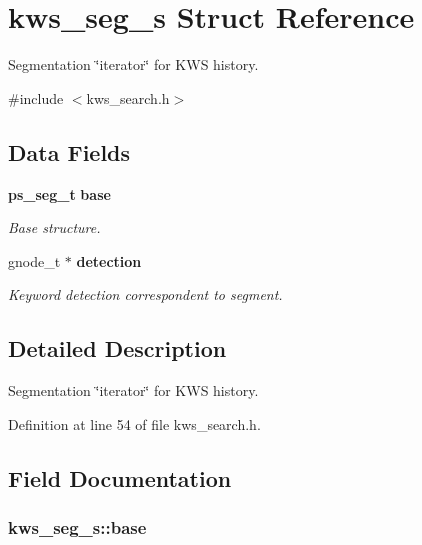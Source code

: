 \section{kws\+\_\+seg\+\_\+s Struct Reference}
\label{structkws__seg__s}


Segmentation \char`\"{}iterator\char`\"{} for K\+W\+S history.  




{\ttfamily \#include $<$kws\+\_\+search.\+h$>$}

\subsection*{Data Fields}
\begin{DoxyCompactItemize}
\item 
{\bf ps\+\_\+seg\+\_\+t} {\bf base}
\begin{DoxyCompactList}\small\item\em Base structure. \end{DoxyCompactList}\item 
gnode\+\_\+t $\ast$ {\bf detection}
\begin{DoxyCompactList}\small\item\em Keyword detection correspondent to segment. \end{DoxyCompactList}\end{DoxyCompactItemize}


\subsection{Detailed Description}
Segmentation \char`\"{}iterator\char`\"{} for K\+W\+S history. 

Definition at line 54 of file kws\+\_\+search.\+h.



\subsection{Field Documentation}
\subsubsection[{base}]{ kws\+\_\+seg\+\_\+s\+::base}\label{structkws__seg__s_ab8b059f475f5e64301195cf9816bde2a}


